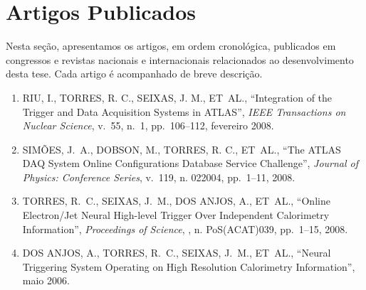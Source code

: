 \chapter{Artigos Publicados}
\label{chap:publicacoes}

\newcommand{\enquote}[1]{``#1''}

Nesta seção, apresentamos os artigos, em ordem cronológica, publicados em congressos e revistas nacionais e internacionais relacionados ao desenvolvimento desta tese. Cada artigo é acompanhado de breve descrição.

\begin{enumerate}

\item \MakeUppercase{ Riu, I., Torres, R. C., Seixas, J. M., \MakeLowercase{et~al.}},
  \enquote{Integration of the Trigger and Data Acquisition Systems in {ATLAS}},
  {\em IEEE Transactions on Nuclear Science\/}, v.~55, n.~1, pp.~106--112,
  fevereiro 2008.

\item \MakeUppercase{ Sim{\~o}es, J.~A., Dobson, M., Torres, R. C.,
  \MakeLowercase{et~al.}}, \enquote{The {ATLAS} {DAQ} System Online
  Configurations Database Service Challenge}, {\em Journal of Physics:
  Conference Series\/}, v.~119, n. 022004, pp.~1--11, 2008.

\item \MakeUppercase{ Torres, R.~C., Seixas, J.~M., {dos Anjos}, A.,
  \MakeLowercase{et~al.}}, \enquote{Online Electron/Jet Neural High-level
  Trigger Over Independent Calorimetry Information}, {\em Proceedings of
  Science\/}, , n. PoS(ACAT)039, pp.~1--15, 2008.

\item \MakeUppercase{ {{dos} Anjos}, A., Torres, R.~C., Seixas, J.~M.,
  \MakeLowercase{et~al.}}, \enquote{Neural Triggering System Operating on High
  Resolution Calorimetry Information}, maio 2006.


\end{enumerate} 
